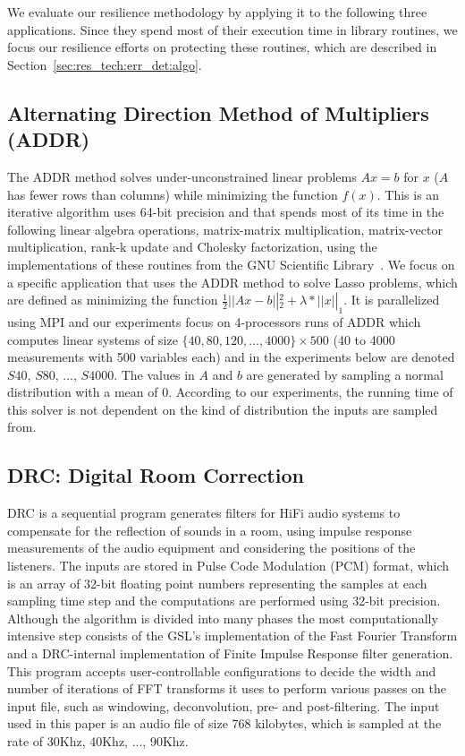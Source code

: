 \documentclass{sig-alternate}
\newcommand{\greg}[1]{%
  \textcolor{blue}{GB: #1}
}
\begin{document}
We evaluate our resilience methodology by applying it to the following three applications.
Since they spend most of their execution time in library routines, we focus our resilience efforts on protecting these routines, which are described in Section~\ref{sec:res_tech:err_det:algo}.


\subsection{Alternating Direction Method of Multipliers (ADDR)}
\label{sec:apps:lasso}
The ADDR method solves under-unconstrained linear problems $Ax=b$ for $x$ ($A$ has fewer rows than columns) while minimizing the function $f(x)$.
This is an iterative algorithm uses 64-bit precision and that spends most of its time in the following linear algebra operations, matrix-matrix multiplication, matrix-vector multiplication, rank-k update and Cholesky factorization, using the implementations of these routines from the GNU Scientific Library~\cite{gsl:2011}.
We focus on a specific application that uses the ADDR method to solve Lasso problems, which are defined as minimizing the function $\frac{1}{2} \left|| Ax - b \right||_2^2 + \lambda*\left|| x \right||_1$.
It is parallelized using MPI and our experiments focus on 4-processors runs of ADDR which computes linear systems of size $\{40, 80, 120, ..., 4000\} \times 500$ (40 to 4000 measurements with 500 variables each) and in the experiments below are denoted $S40$, $S80$, ..., $S4000$.
The values in $A$ and $b$ are generated by sampling a normal distribution with a mean of 0.
According to our experiments, the running time of this solver is not dependent on the kind of distribution the inputs are sampled from.

\subsection{DRC: Digital Room Correction}
\label{sec:apps:drc}

DRC is a sequential program generates filters for HiFi audio systems to compensate for the reflection of sounds in a room, using impulse response measurements of the audio equipment and considering the positions of the listeners.
The inputs are stored in Pulse Code Modulation (PCM) format, which is an array of 32-bit floating point numbers representing the samples at each sampling time step and the computations are performed using 32-bit precision.
Although the algorithm is divided into many phases the most computationally intensive step consists of the GSL's implementation of the Fast Fourier Transform and a DRC-internal implementation of Finite Impulse Response filter generation.
This program accepts user-controllable configurations to decide the width and number of iterations of FFT transforms it uses to perform various passes on the input file, such as windowing, deconvolution, pre- and post-filtering.
The input used in this paper is an audio file of size 768 kilobytes, which is sampled at the rate of 30Khz, 40Khz, ..., 90Khz.
\end{document}
